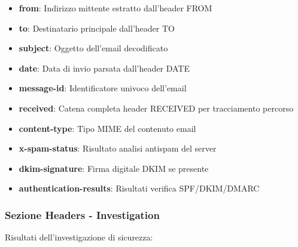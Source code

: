 \documentclass{article}
\begin{document}
\begin{itemize}
    \item \textbf{from}: Indirizzo mittente estratto dall'header FROM
    \item \textbf{to}: Destinatario principale dall'header TO
    \item \textbf{subject}: Oggetto dell'email decodificato
    \item \textbf{date}: Data di invio parsata dall'header DATE
    \item \textbf{message-id}: Identificatore univoco dell'email
    \item \textbf{received}: Catena completa header RECEIVED per tracciamento percorso
    \item \textbf{content-type}: Tipo MIME del contenuto email
    \item \textbf{x-spam-status}: Risultato analisi antispam del server
    \item \textbf{dkim-signature}: Firma digitale DKIM se presente
    \item \textbf{authentication-results}: Risultati verifica SPF/DKIM/DMARC
\end{itemize}

\subsubsection{Sezione Headers - Investigation}

Risultati dell'investigazione di sicurezza:
\end{document}
